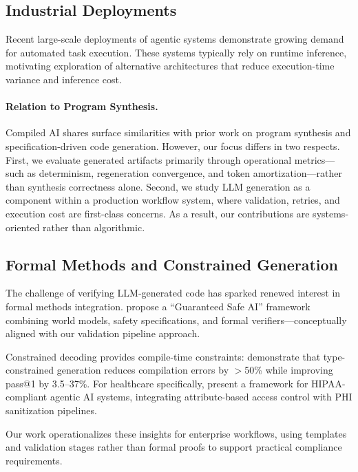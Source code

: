 \documentclass[11pt]{article}
\begin{document}
\subsection{Industrial Deployments}

Recent large-scale deployments of agentic systems demonstrate growing demand for automated task execution. These systems typically rely on runtime inference, motivating exploration of alternative architectures that reduce execution-time variance and inference cost.

\paragraph{Relation to Program Synthesis.}
Compiled AI shares surface similarities with prior work on program synthesis and specification-driven code generation. However, our focus differs in two respects. First, we evaluate generated artifacts primarily through operational metrics---such as determinism, regeneration convergence, and token amortization---rather than synthesis correctness alone. Second, we study LLM generation as a component within a production workflow system, where validation, retries, and execution cost are first-class concerns. As a result, our contributions are systems-oriented rather than algorithmic.

\subsection{Formal Methods and Constrained Generation}

The challenge of verifying LLM-generated code has sparked renewed interest in formal methods integration. \citet{dalrymple2024guaranteed} propose a ``Guaranteed Safe AI'' framework combining world models, safety specifications, and formal verifiers---conceptually aligned with our validation pipeline approach.

Constrained decoding provides compile-time constraints: \citet{mundler2025typeconstrained} demonstrate that type-constrained generation reduces compilation errors by $>$50\% while improving pass@1 by 3.5--37\%. For healthcare specifically, \citet{neupane2025hipaa} present a framework for HIPAA-compliant agentic AI systems, integrating attribute-based access control with PHI sanitization pipelines.

Our work operationalizes these insights for enterprise workflows, using templates and validation stages rather than formal proofs to support practical compliance requirements.
\end{document}
